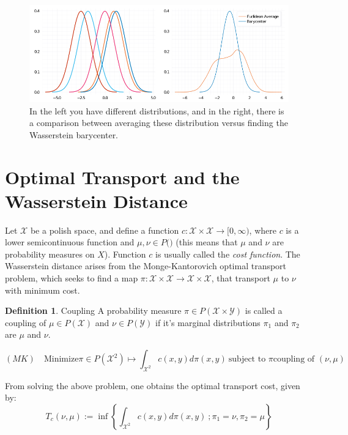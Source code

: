 \documentclass[10pt]{article}
\theoremstyle{definition}
\newtheorem{definition}{Definition}[section]
\begin{document}
\begin{figure}[h]
	\centering
	\includegraphics[width=14cm]{images/Barycenter.png}
    \caption{In the left you have different distributions, and in the right,
    there is a comparison between averaging these distribution versus finding the
    Wasserstein barycenter.}
    \label{fig:barycenter}
\end{figure}

\section{Optimal Transport and the Wasserstein Distance}

Let $\mathcal X$ be a polish space, and define a function
$c: \mathcal X \times \mathcal X \rightarrow [0,\infty)$, where $c$ is a lower semicontinuous function and $\mu,\nu \in P(\mathcal)$ (this means that $\mu$ and $\nu$ are
probability measures on $X$). Function $c$ is usually called the \textit{cost function}.
The Wasserstein distance arises from the Monge-Kantorovich optimal transport problem, which
seeks to find a map
$\pi: \mathcal X \times \mathcal X \rightarrow \mathcal X \times \mathcal X$, that
transport $\mu$ to $\nu$ with minimum cost.

\theoremstyle{definition}
\begin{definition}{Coupling}
A probability measure $\pi \in P(\mathcal X \times \mathcal Y)$ is called a coupling of
$\mu \in P(\mathcal X)$ and $\nu \in P(\mathcal Y)$ if it's marginal distributions
$\pi_1$ and $\pi_2$ are
$\mu$ and $\nu$.
\end{definition}

\begin{equation*}
	(MK) \quad \text{Minimize} \pi \in P(\mathcal X^2) \mapsto
	\int_{\mathcal X^2} c(x,y) d\pi(x,y) \ \text{subject to } \pi
	\text{coupling of } (\nu,\mu)
\end{equation*}

From solving the above problem, one obtains the optimal transport cost, given by:
\begin{equation}
	T_c(\nu, \mu) :=
	\inf \left\{
		\int_{\mathcal X^2} c(x,y) d\pi(x,y) \ ; \pi_1 = \nu, \pi_2 = \mu
	\right\}
\end{equation}
\end{document}
